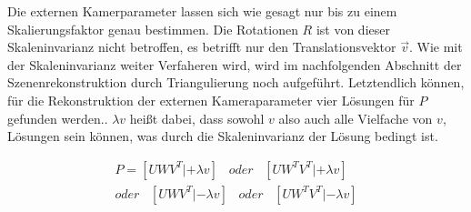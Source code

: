  Die externen Kamerparameter lassen sich wie gesagt nur bis zu einem Skalierungsfaktor genau bestimmen. Die Rotationen $R$ ist von dieser Skaleninvarianz nicht betroffen, es betrifft nur den Translationsvektor $\vec{v}$. Wie mit der Skaleninvarianz weiter Verfaheren wird, wird im nachfolgenden Abschnitt der Szenenrekonstruktion durch Triangulierung noch aufgeführt. Letztendlich können, für die Rekonstruktion der externen Kameraparameter vier Lösungen für $P$ gefunden werden.\cite{HZ,Ferid}. $\lambda v$ heißt dabei, dass sowohl $v$ also auch alle Vielfache von $v$, Lösungen sein können, was durch die Skaleninvarianz der Lösung bedingt ist\cite{HZ,Ferid}. 

\begin{gather}
P = [UWV^T|+\lambda v] \;\;\; \textit{oder} \;\;\;[UW^TV^T|+\lambda v]\\
\textit{oder}\;\;\; [UWV^T|-\lambda v] \;\;\; \textit{oder} \;\;\;[UW^TV^T|-\lambda v]
\end{gather}

